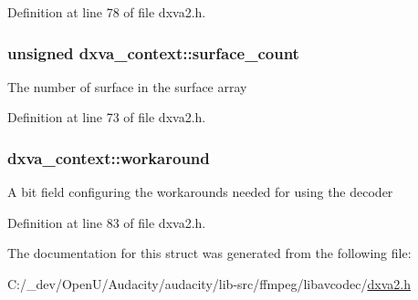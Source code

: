 Definition at line 78 of file dxva2.\+h.

\subsubsection[{\texorpdfstring{surface\+\_\+count}{surface_count}}]{\setlength{\rightskip}{0pt plus 5cm}unsigned dxva\+\_\+context\+::surface\+\_\+count}\hypertarget{structdxva__context_a850b67a58a1925ea525461f7e2899384}{}\label{structdxva__context_a850b67a58a1925ea525461f7e2899384}
The number of surface in the surface array 

Definition at line 73 of file dxva2.\+h.

\subsubsection[{\texorpdfstring{workaround}{workaround}}]{ dxva\+\_\+context\+::workaround}\hypertarget{structdxva__context_a5d10a13f859a2a39ef586786e2f836ea}{}\label{structdxva__context_a5d10a13f859a2a39ef586786e2f836ea}
A bit field configuring the workarounds needed for using the decoder 

Definition at line 83 of file dxva2.\+h.



The documentation for this struct was generated from the following file\+:\begin{DoxyCompactItemize}
\item 
C\+:/\+\_\+dev/\+Open\+U/\+Audacity/audacity/lib-\/src/ffmpeg/libavcodec/\hyperlink{dxva2_8h}{dxva2.\+h}\end{DoxyCompactItemize}
